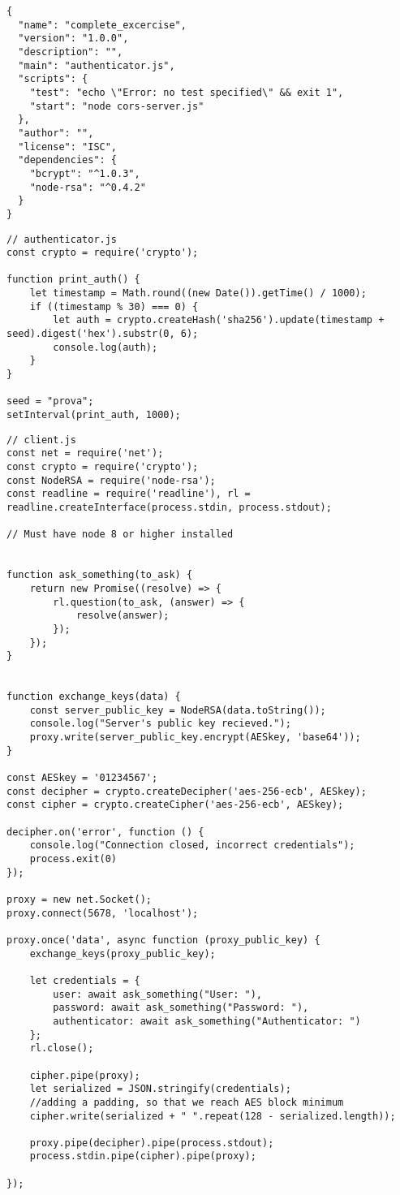 \begin{lstlisting}[style=verb]
{
  "name": "complete_excercise",
  "version": "1.0.0",
  "description": "",
  "main": "authenticator.js",
  "scripts": {
    "test": "echo \"Error: no test specified\" && exit 1",
    "start": "node cors-server.js"
  },
  "author": "",
  "license": "ISC",
  "dependencies": {
    "bcrypt": "^1.0.3",
    "node-rsa": "^0.4.2"
  }
}
\end{lstlisting}

\begin{lstlisting}[style=JavaScript]
// authenticator.js
const crypto = require('crypto');

function print_auth() {
    let timestamp = Math.round((new Date()).getTime() / 1000);
    if ((timestamp % 30) === 0) {
        let auth = crypto.createHash('sha256').update(timestamp + seed).digest('hex').substr(0, 6);
        console.log(auth);
    }
}

seed = "prova";
setInterval(print_auth, 1000);
\end{lstlisting}

\begin{lstlisting}[style=JavaScript]
// client.js
const net = require('net');
const crypto = require('crypto');
const NodeRSA = require('node-rsa');
const readline = require('readline'), rl = readline.createInterface(process.stdin, process.stdout);

// Must have node 8 or higher installed


function ask_something(to_ask) {
    return new Promise((resolve) => {
        rl.question(to_ask, (answer) => {
            resolve(answer);
        });
    });
}


function exchange_keys(data) {
    const server_public_key = NodeRSA(data.toString());
    console.log("Server's public key recieved.");
    proxy.write(server_public_key.encrypt(AESkey, 'base64'));
}

const AESkey = '01234567';
const decipher = crypto.createDecipher('aes-256-ecb', AESkey);
const cipher = crypto.createCipher('aes-256-ecb', AESkey);

decipher.on('error', function () {
    console.log("Connection closed, incorrect credentials");
    process.exit(0)
});

proxy = new net.Socket();
proxy.connect(5678, 'localhost');

proxy.once('data', async function (proxy_public_key) {
    exchange_keys(proxy_public_key);

    let credentials = {
        user: await ask_something("User: "),
        password: await ask_something("Password: "),
        authenticator: await ask_something("Authenticator: ")
    };
    rl.close();

    cipher.pipe(proxy);
    let serialized = JSON.stringify(credentials);
    //adding a padding, so that we reach AES block minimum
    cipher.write(serialized + " ".repeat(128 - serialized.length));

    proxy.pipe(decipher).pipe(process.stdout);
    process.stdin.pipe(cipher).pipe(proxy);

});
\end{lstlisting}


